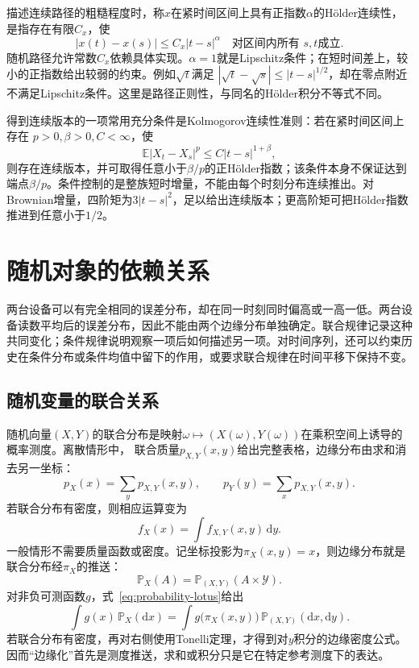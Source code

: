 描述连续路径的粗糙程度时，称\(x\)在紧时间区间上具有正指数\(\alpha\)的Hölder连续性，是指存在有限\(C_x\)，使
\[
 |x(t)-x(s)|\leq C_x|t-s|^\alpha
 \quad\text{对区间内所有 }s,t\text{成立}.
\]
随机路径允许常数\(C_x\)依赖具体实现。\(\alpha=1\)就是Lipschitz条件；在短时间差上，较小的正指数给出较弱的约束。例如\(\sqrt t\)满足
\(|\sqrt t-\sqrt s|\leq|t-s|^{1/2}\)，却在零点附近不满足Lipschitz条件。这里是路径正则性，与同名的Hölder积分不等式不同。

得到连续版本的一项常用充分条件是Kolmogorov连续性准则：若在紧时间区间上存在
\(p>0,\beta>0,C<\infty\)，使
\[
\mathbb E|X_t-X_s|^p\leq C|t-s|^{1+\beta},
\]
则存在连续版本，并可取得任意小于\(\beta/p\)的正Hölder指数；该条件本身不保证达到端点\(\beta/p\)。条件控制的是整族短时增量，不能由每个时刻分布连续推出。对Brownian增量，四阶矩为\(3|t-s|^2\)，足以给出连续版本；更高阶矩可把Hölder指数推进到任意小于\(1/2\)。

\section{随机对象的依赖关系}
\label{sec:rv-relations}
两台设备可以有完全相同的误差分布，却在同一时刻同时偏高或一高一低。两台设备读数平均后的误差分布，因此不能由两个边缘分布单独确定。联合规律记录这种共同变化；条件规律说明观察一项后如何描述另一项。对时间序列，还可以约束历史在条件分布或条件均值中留下的作用，或要求联合规律在时间平移下保持不变。

\subsection{随机变量的联合关系}
\label{sec:rv-joint}
\label{sec:probability-joint-marginal-conditional}
随机向量\((X,Y)\)的联合分布是映射\(\omega\mapsto(X(\omega),Y(\omega))\)在乘积空间上诱导的概率测度。离散情形中，
联合质量\(p_{X,Y}(x,y)\)给出完整表格，边缘分布由求和消去另一坐标：
\[ p_X(x)=\sum_y p_{X,Y}(x,y),
  \qquad p_Y(y)=\sum_x p_{X,Y}(x,y). \]
若联合分布有密度，则相应运算变为
\[ f_X(x)=\int f_{X,Y}(x,y)\,\mathrm{d}y. \]
一般情形不需要质量函数或密度。记坐标投影为\(\pi_X(x,y)=x\)，则边缘分布就是联合分布经\(\pi_X\)的推送：
\[
  \mathbb{P}_X(A)
  =\mathbb{P}_{(X,Y)}(A\times\mathcal{Y}).
\]
对非负可测函数\(g\)，式~\eqref{eq:probability-lotus}给出
\[
  \int g(x)\,\mathbb{P}_X(\mathrm{d}x)
  =
  \int g\bigl(\pi_X(x,y)\bigr)\,
       \mathbb{P}_{(X,Y)}(\mathrm{d}x,\mathrm{d}y).
\]
若联合分布有密度，再对右侧使用Tonelli定理，才得到对\(y\)积分的边缘密度公式。因而“边缘化”首先是测度推送，求和或积分只是它在特定参考测度下的表达。

